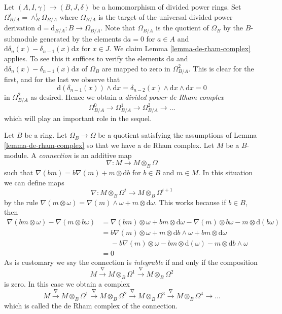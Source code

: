 \begin{remark}
\label{remark-divided-powers-de-rham-complex}
Let $(A, I, \gamma) \to (B, J, \delta)$ be a homomorphism
of divided power rings. Set $\Omega_{B/A}^i = \wedge^i_B \Omega_{B/A}$
where $\Omega_{B/A}$ is the target of the universal divided power
derivation $\text{d} = \text{d}_{B/A} : B \to \Omega_{B/A}$.
Note that $\Omega_{B/A}$ is the quotient of $\Omega_B$ by the
$B$-submodule generated by the elements
$\text{d}a = 0$ for $a \in A$ and
$\text{d}\delta_n(x) - \delta_{n - 1}(x)\text{d}x$ for $x \in J$.
We claim Lemma \ref{lemma-de-rham-complex} applies.
To see this it suffices to verify the elements
$\text{d}a$ and $\text{d}\delta_n(x) - \delta_{n - 1}(x)\text{d}x$
of $\Omega_B$ are mapped to zero in $\Omega^2_{B/A}$.
This is clear for the first, and for the last we observe that
$$
\text{d}(\delta_{n - 1}(x)) \wedge \text{d}x
= \delta_{n - 2}(x) \wedge \text{d}x \wedge \text{d}x = 0
$$
in $\Omega^2_{B/A}$ as desired. Hence we obtain a
{\it divided power de Rham complex}
$$
\Omega^0_{B/A} \to \Omega^1_{B/A} \to \Omega^2_{B/A} \to \ldots
$$
which will play an important role in the sequel.
\end{remark}

\begin{remark}
\label{remark-connection}
Let $B$ be a ring. Let $\Omega_B \to \Omega$ be a quotient satisfying
the assumptions of Lemma \ref{lemma-de-rham-complex} so
that we have a de Rham complex. Let $M$ be a $B$-module.
A {\it connection} is an additive map
$$
\nabla : M \longrightarrow M \otimes_B \Omega
$$
such that $\nabla(bm) = b \nabla(m) + m \otimes \text{d}b$
for $b \in B$ and $m \in M$. In this situation we can define maps
$$
\nabla : M \otimes_B \Omega^i \longrightarrow M \otimes_B \Omega^{i + 1}
$$
by the rule $\nabla(m \otimes \omega) = \nabla(m) \wedge \omega +
m \otimes \text{d}\omega$. This works because if $b \in B$, then
\begin{align*}
\nabla(bm \otimes \omega) - \nabla(m \otimes b\omega)
& =
\nabla(bm) \otimes \omega + bm \otimes \text{d}\omega
- \nabla(m) \otimes b\omega - m \otimes \text{d}(b\omega) \\
& =
b\nabla(m) \otimes \omega + m \otimes \text{d}b \wedge \omega
+ bm \otimes \text{d}\omega \\
&\ \ \ \ \ \ - b\nabla(m) \otimes \omega - bm \otimes \text{d}(\omega)
- m \otimes \text{d}b \wedge \omega \\
& = 0
\end{align*}
As is customary we say the connection is {\it integrable} if and
only if the composition
$$
M \xrightarrow{\nabla} M \otimes_B \Omega^1
\xrightarrow{\nabla} M \otimes_B \Omega^2
$$
is zero. In this case we obtain a complex
$$
M \xrightarrow{\nabla} M \otimes_B \Omega^1
\xrightarrow{\nabla} M \otimes_B \Omega^2
\xrightarrow{\nabla} M \otimes_B \Omega^3
\xrightarrow{\nabla} M \otimes_B \Omega^4 \to \ldots
$$
which is called the de Rham complex of the connection.
\end{remark}




